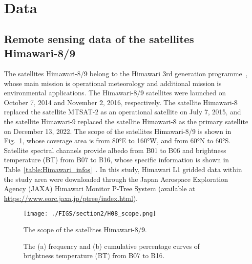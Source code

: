 \documentclass[review]{elsarticle}
\begin{document}
\section{Data}
\label{section:Data}
\subsection{Remote sensing data of the satellites Himawari-8/9}
\label{section:RS}
The satellites Himawari-8/9 belong to the Himawari 3rd generation programme~\citep{BESSHO2016, Kurihara2016, YANG2020117068}, whose main mission is operational meteorology and additional mission is environmental applications.
The Himawari-8/9 satellites were launched on October 7, 2014 and November 2, 2016, respectively.
The satellite Himawari-8 replaced the satellite MTSAT-2 as an operational satellite on July 7, 2015, and the satellite Himawari-9 replaced the satellite Himawari-8 as the primary satellite on December 13, 2022.
The scope of the satellites Himawari-8/9 is shown in Fig.~\ref{fig:H08_scope}, whose coverage area is from 80°E to 160°W, and from 60°N to 60°S.
Satellite spectral channels provide albedo from B01 to B06 and brightness temperature (BT) from B07 to B16, whose specific information is shown in Table~\ref{table:Himawari_infos}~\citep{HuangYipeng122, Taniguchi2022}.
In this study, Himawari L1 gridded data within the study area were downloaded through the Japan Aerospace Exploration Agency (JAXA) Himawari Monitor P-Tree System (available at \href{https://www.eorc.jaxa.jp/ptree/index.html}{https://www.eorc.jaxa.jp/ptree/index.html}).

\begin{figure}[!htp]
    \vspace{5mm}
    \centering
    \texttt{[image: ./FIGS/section2/H08\_scope.png]}
    \caption{The scope of the satellites Himawari-8/9.}
    \label{fig:H08_scope}
\end{figure}



\begin{figure}[!htp]
    \centering
    \caption{The (a) frequency and (b) cumulative percentage curves of brightness temperature (BT) from B07 to B16.}
    \label{fig:RS_BT}
\end{figure}
\end{document}
